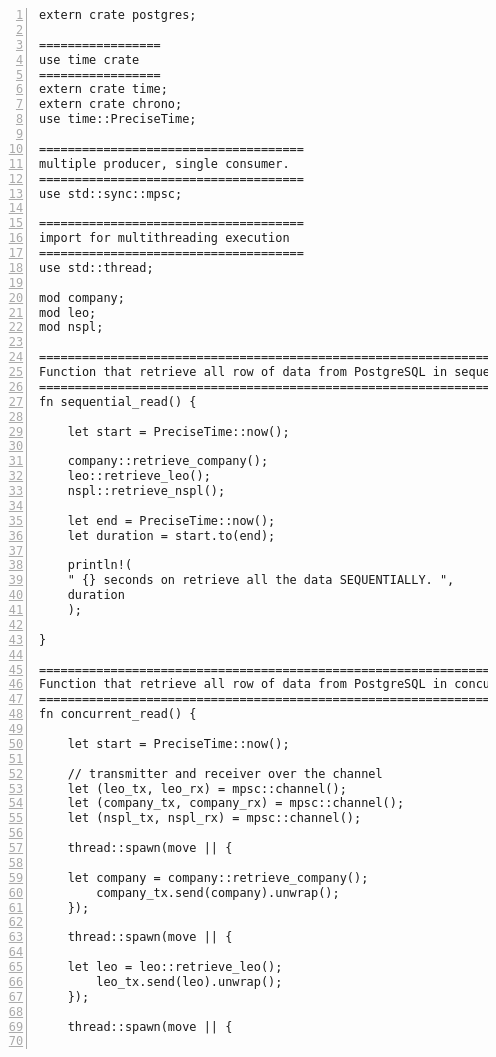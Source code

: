 \lstset{basicstyle=\ttfamily\tiny}  
\begin{lstlisting}[breaklines, frame=single, numbers=left, caption={Main function for sequential execution. (main.rs)}, label=commandline-02]
extern crate postgres;

=================
use time crate
=================
extern crate time;
extern crate chrono;
use time::PreciseTime;

=====================================
multiple producer, single consumer.
=====================================
use std::sync::mpsc;

=====================================
import for multithreading execution
=====================================
use std::thread;

mod company;
mod leo;
mod nspl;

===========================================================================
Function that retrieve all row of data from PostgreSQL in sequential manner 
===========================================================================
fn sequential_read() {

	let start = PreciseTime::now();
	
	company::retrieve_company();
	leo::retrieve_leo();
	nspl::retrieve_nspl();
	
	let end = PreciseTime::now();
	let duration = start.to(end);
	
	println!(
	" {} seconds on retrieve all the data SEQUENTIALLY. ",
	duration
	);

}

===========================================================================
Function that retrieve all row of data from PostgreSQL in concurrent manner 
===========================================================================
fn concurrent_read() {

	let start = PreciseTime::now();
	
	// transmitter and receiver over the channel
	let (leo_tx, leo_rx) = mpsc::channel();
	let (company_tx, company_rx) = mpsc::channel();
	let (nspl_tx, nspl_rx) = mpsc::channel();
	
	thread::spawn(move || {
	
	let company = company::retrieve_company();
		company_tx.send(company).unwrap();
	});
	
	thread::spawn(move || {
	
	let leo = leo::retrieve_leo();
		leo_tx.send(leo).unwrap();
	});
	
	thread::spawn(move || {
	

\end{lstlisting}
